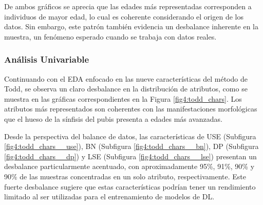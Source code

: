 De ambos gráficos se aprecia que las edades más representadas corresponden a individuos de mayor edad, lo cual es coherente considerando el origen de los datos. Sin embargo, este patrón también evidencia un desbalance inherente en la muestra, un fenómeno esperado cuando se trabaja con datos reales.

\subsubsection{Análisis Univariable}
Continuando con el EDA enfocado en las nueve características del método de Todd, se observa un claro desbalance en la distribución de atributos, como se muestra en las gráficas correspondientes en la Figura \ref{fig4:todd_chars}. Los atributos más representados son coherentes con las manifestaciones morfológicas que el hueso de la sínfisis del pubis presenta a edades más avanzadas.

Desde la perspectiva del balance de datos, las características de USE (Subfigura \ref{fig4:todd_chars__use}), BN (Subfigura \ref{fig4:todd_chars__bn}), DP (Subfigura \ref{fig4:todd_chars__dp}) y LSE (Subfigura \ref{fig4:todd_chars__lse}) presentan un desbalance particularmente acentuado, con aproximadamente 95\%, 91\%, 90\% y 90\% de las muestras concentradas en un solo atributo, respectivamente. Este fuerte desbalance sugiere que estas características podrían tener un rendimiento limitado al ser utilizadas para el entrenamiento de modelos de DL.

